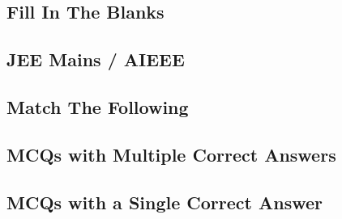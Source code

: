 \subsection*{Fill In The Blanks}
\begin{enumerate}[label=\thesubsection.\arabic*,ref=\thesubsection.\theenumi]




\end{enumerate}
\subsection*{JEE Mains / AIEEE}
\begin{enumerate}[label=\thesubsection.\arabic*,ref=\thesubsection.\theenumi]







\end{enumerate}
\subsection*{Match The Following}
\begin{enumerate}[label=\thesubsection.\arabic*,ref=\thesubsection.\theenumi]




\end{enumerate}
\subsection*{MCQs with Multiple Correct Answers}
\begin{enumerate}[label=\thesubsection.\arabic*,ref=\thesubsection.\theenumi]





\end{enumerate}
\subsection*{MCQs with a Single Correct Answer}
\begin{enumerate}[label=\thesubsection.\arabic*,ref=\thesubsection.\theenumi]






\end{enumerate}
